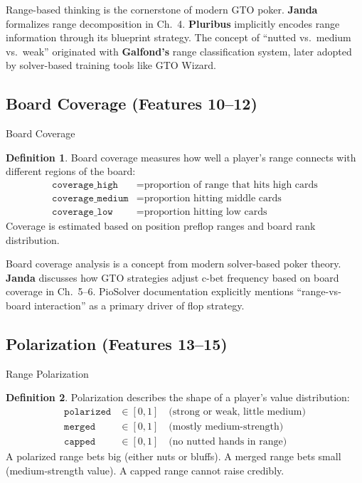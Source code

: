 \documentclass[11pt, a4paper]{article}
\theoremstyle{definition}
\newtheorem{definition}{Definition}[section]
\newcommand{\feature}[1]{\texttt{#1}}
\begin{document}
\begin{refbox}
Range-based thinking is the cornerstone of modern GTO poker. \textbf{Janda} \cite{janda2017} formalizes range decomposition in Ch.~4. \textbf{Pluribus} \cite{brown2019} implicitly encodes range information through its blueprint strategy. The concept of ``nutted vs.\ medium vs.\ weak'' originated with \textbf{Galfond's} range classification system, later adopted by solver-based training tools like GTO Wizard.
\end{refbox}

\subsection{Board Coverage (Features 10--12)}

\begin{featurebox}{Board Coverage}
\begin{definition}
Board coverage measures how well a player's range connects with different regions of the board:
\begin{align}
    \feature{coverage\_high} &= \text{proportion of range that hits high cards} \\
    \feature{coverage\_medium} &= \text{proportion hitting middle cards} \\
    \feature{coverage\_low} &= \text{proportion hitting low cards}
\end{align}
Coverage is estimated based on position preflop ranges and board rank distribution.
\end{definition}
\end{featurebox}

\begin{refbox}
Board coverage analysis is a concept from modern solver-based poker theory. \textbf{Janda} \cite{janda2017} discusses how GTO strategies adjust c-bet frequency based on board coverage in Ch.~5--6. PioSolver documentation explicitly mentions ``range-vs-board interaction'' as a primary driver of flop strategy.
\end{refbox}

\subsection{Polarization (Features 13--15)}

\begin{featurebox}{Range Polarization}
\begin{definition}
Polarization describes the shape of a player's value distribution:
\begin{align}
    \feature{polarized} &\in [0, 1] \quad \text{(strong or weak, little medium)} \\
    \feature{merged} &\in [0, 1] \quad \text{(mostly medium-strength)} \\
    \feature{capped} &\in [0, 1] \quad \text{(no nutted hands in range)}
\end{align}
A polarized range bets big (either nuts or bluffs). A merged range bets small (medium-strength value). A capped range cannot raise credibly.
\end{definition}
\end{featurebox}
\end{document}
